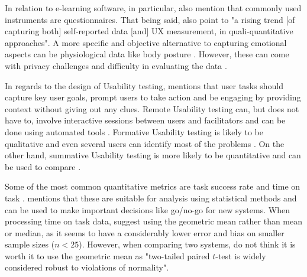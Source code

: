 In relation to e-learning software, in particular, \textcite{Darin_et_all_2019} also mention that commonly used instruments are questionnaires.
That being said, \textcite[p. 60]{Darin_et_all_2019} also point to "a rising trend [of capturing both] self-reported data [and] UX measurement, in quali-quantitative approaches".
A more specific and objective alternative to capturing emotional aspects can be physiological data like body posture \parencite{Tan_Schöning_Luyten_Coninx_2013}.
However, these can come with privacy challenges and difficulty in evaluating the data \parencite{Juergen_et_all_2020}.

In regards to the design of Usability testing, \textcite{McCloskey_2014} mentions that user tasks should capture key user goals, prompt users to take action and be engaging by providing context without giving out any clues.
Remote Usability testing can, but does not have to, involve interactive sessions between users and facilitators and can be done using automated tools \parencite{Moran_2019}.
Formative Usability testing is likely to be qualitative and even several users can identify most of the problems \parencite{Lewis_2014,Moran_2019}.
On the other hand, summative Usability testing is more likely to be quantitative and can be used to compare \parencite{Macefield_2009, Moran_2019}.

Some of the most common quantitative metrics are task success rate and time on task \parencite{Macefield_2009, Moran_2019}.
\textcite{Macefield_2009} mentions that these are suitable for analysis using statistical methods and can be used to make important decisions like go/no-go for new systems.
When processing time on task data, \textcite{sauro_chapter3_2016} suggest using the geometric mean rather than mean or median, as it seems to have a considerably lower error and bias on smaller sample sizes ($n < 25$).
However, when comparing two systems, \textcite{sauro_chapter5_2016} do not think it is worth it to use the geometric mean as "two-tailed paired $t$-test is widely considered robust to violations of normality".

